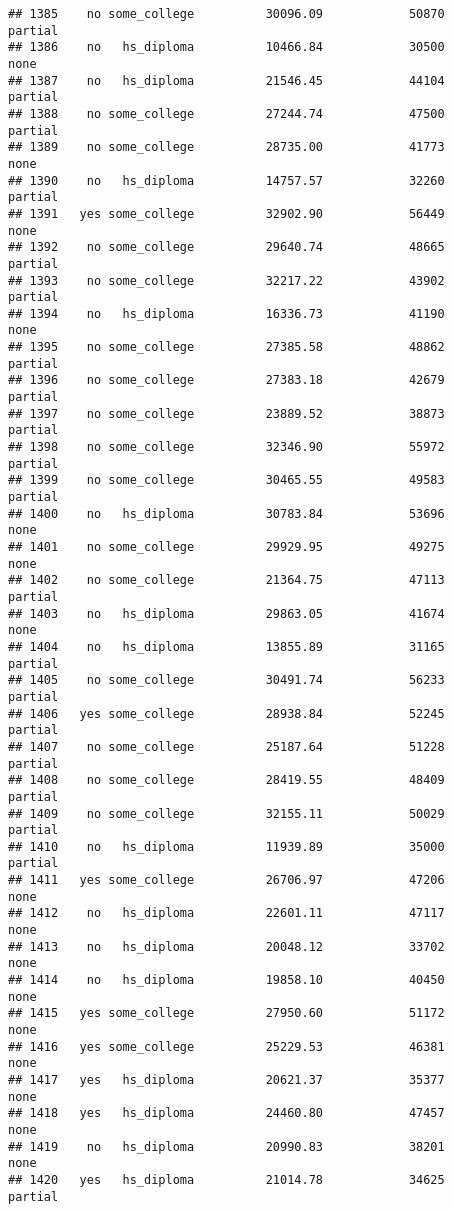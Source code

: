\documentclass[
]{article}
\begin{document}
\begin{verbatim}
## 1385    no some_college          30096.09            50870     partial
## 1386    no   hs_diploma          10466.84            30500        none
## 1387    no   hs_diploma          21546.45            44104     partial
## 1388    no some_college          27244.74            47500     partial
## 1389    no some_college          28735.00            41773        none
## 1390    no   hs_diploma          14757.57            32260     partial
## 1391   yes some_college          32902.90            56449        none
## 1392    no some_college          29640.74            48665     partial
## 1393    no some_college          32217.22            43902     partial
## 1394    no   hs_diploma          16336.73            41190        none
## 1395    no some_college          27385.58            48862     partial
## 1396    no some_college          27383.18            42679     partial
## 1397    no some_college          23889.52            38873     partial
## 1398    no some_college          32346.90            55972     partial
## 1399    no some_college          30465.55            49583     partial
## 1400    no   hs_diploma          30783.84            53696        none
## 1401    no some_college          29929.95            49275        none
## 1402    no some_college          21364.75            47113     partial
## 1403    no   hs_diploma          29863.05            41674        none
## 1404    no   hs_diploma          13855.89            31165     partial
## 1405    no some_college          30491.74            56233     partial
## 1406   yes some_college          28938.84            52245     partial
## 1407    no some_college          25187.64            51228     partial
## 1408    no some_college          28419.55            48409     partial
## 1409    no some_college          32155.11            50029     partial
## 1410    no   hs_diploma          11939.89            35000     partial
## 1411   yes some_college          26706.97            47206        none
## 1412    no   hs_diploma          22601.11            47117        none
## 1413    no   hs_diploma          20048.12            33702        none
## 1414    no   hs_diploma          19858.10            40450        none
## 1415   yes some_college          27950.60            51172        none
## 1416   yes some_college          25229.53            46381        none
## 1417   yes   hs_diploma          20621.37            35377        none
## 1418   yes   hs_diploma          24460.80            47457        none
## 1419    no   hs_diploma          20990.83            38201        none
## 1420   yes   hs_diploma          21014.78            34625     partial

\end{verbatim}
\end{document}
